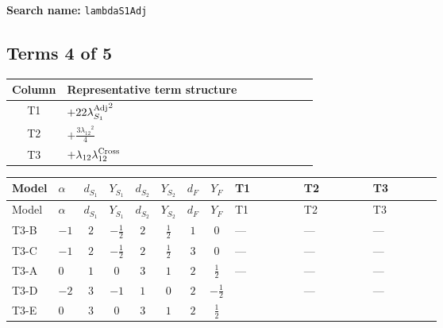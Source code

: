 \documentclass[8pt]{article}
\begin{document}
\begin{landscape}
\begin{longtable}{@{}llcccccc >{\raggedright\arraybackslash}p{0.21\linewidth} >{\raggedright\arraybackslash}p{0.21\linewidth} >{\raggedright\arraybackslash}p{0.21\linewidth}@{}}
\midrule
\bottomrule
\end{longtable}
\clearpage
\noindent\textbf{Search name: }\texttt{lambdaS1Adj}\par\smallskip
\subsection*{Terms 4 of 5}
\begin{center}
\begin{tabular}{@{}c >{\raggedright\arraybackslash}p{0.82\linewidth}@{}}
\toprule
Column & Representative term structure \\
\midrule
T1 & \(\displaystyle +22 {\lambda_{S_1}^{\rm Adj}}^2\) \\
\midrule
T2 & \(\displaystyle +\frac{3 {\lambda_{12}}^2}{4}\) \\
\midrule
T3 & \(\displaystyle +{\lambda_{12}} {\lambda_{12}^{\rm Cross}}\) \\
\midrule
\bottomrule
\end{tabular}
\end{center}
\smallskip
\tiny
\begin{longtable}{@{}llcccccc >{\raggedright\arraybackslash}p{0.21\linewidth} >{\raggedright\arraybackslash}p{0.21\linewidth} >{\raggedright\arraybackslash}p{0.21\linewidth}@{}}
\toprule
Model & $\alpha$ & $d_{S_1}$ & $Y_{S_1}$ & $d_{S_2}$ & $Y_{S_2}$ & $d_F$ & $Y_F$ & T1 & T2 & T3 \\
\midrule
\endfirsthead
\toprule
Model & $\alpha$ & $d_{S_1}$ & $Y_{S_1}$ & $d_{S_2}$ & $Y_{S_2}$ & $d_F$ & $Y_F$ & T1 & T2 & T3 \\
\midrule
\endhead
T3-B & $-1$ & $2$ & $-\frac{1}{2}$ & $2$ & $\frac{1}{2}$ & $1$ & $0$ & --- & --- & --- \\
\midrule
T3-C & $-1$ & $2$ & $-\frac{1}{2}$ & $2$ & $\frac{1}{2}$ & $3$ & $0$ & --- & --- & --- \\
\midrule
T3-A & $0$ & $1$ & $0$ & $3$ & $1$ & $2$ & $\frac{1}{2}$ & --- & --- & --- \\
\midrule
T3-D & $-2$ & $3$ & $-1$ & $1$ & $0$ & $2$ & $-\frac{1}{2}$ & \scriptsize\adjustbox{max width=\linewidth}{$\begin{gathered} +22 {\lambda_{S_1}^{\rm Adj}}^2\end{gathered}$} & --- & --- \\
\midrule
T3-E & $0$ & $3$ & $0$ & $3$ & $1$ & $2$ & $\frac{1}{2}$ & \scriptsize\adjustbox{max width=\linewidth}{$\begin{gathered} +22 {\lambda_{S_1}^{\rm Adj}}^2\end{gathered}$} & \scriptsize\adjustbox{max width=\linewidth}{$\begin{gathered} +\frac{3 {\lambda_{12}}^2}{4}\end{gathered}$} & \scriptsize\adjustbox{max width=\linewidth}{$\begin{gathered} +{\lambda_{12}} {\lambda_{12}^{\rm Cross}}\end{gathered}$} \\

\end{longtable}
\end{landscape}
\end{document}
